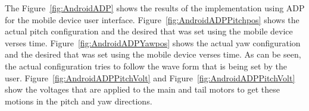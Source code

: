 The Figure~\ref{fig:AndroidADP} shows the results of the implementation using ADP for the mobile device user interface.  Figure~\ref{fig:AndroidADPPitchpos} shows the actual pitch configuration and the desired that was set using the mobile device verses time.  Figure~\ref{fig:AndroidADPYawpos} shows the actual yaw configuration and the desired that was set using the mobile device verses time.  As can be seen, the actual configuration tries to follow the wave form that is being set by the user.  Figure~\ref{fig:AndroidADPPitchVolt} and Figure~\ref{fig:AndroidADPPitchVolt} show the voltages that are applied to the main and tail motors to get these motions in the pitch and yaw directions.
\begin{figure}
    \centering
\end{figure}
